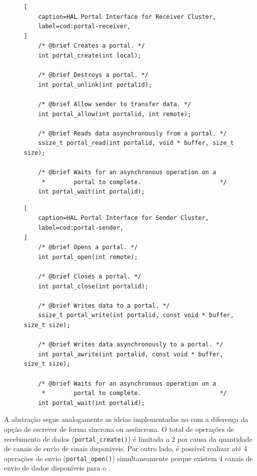\begin{figure}[t]
\begin{lstlisting}[
    caption=HAL Portal Interface for Receiver Cluster,
    label=cod:portal-receiver,
]
	/* @brief Creates a portal. */
    int portal_create(int local);

	/* @brief Destroys a portal. */
    int portal_unlink(int portalid);

    /* @brief Allow sender to transfer data. */
    int portal_allow(int portalid, int remote);

    /* @brief Reads data asynchronously from a portal. */
    ssize_t portal_read(int portalid, void * buffer, size_t size);

    /* @brief Waits for an asynchronous operation on a
     *        portal to complete.                      */
    int portal_wait(int portalid);
\end{lstlisting}
\end{figure}

\begin{figure}[t]
\begin{lstlisting}[
    caption=HAL Portal Interface for Sender Cluster,
    label=cod:portal-sender,
]
    /* @brief Opens a portal. */
    int portal_open(int remote);

	/* @brief Closes a portal. */
    int portal_close(int portalid);

	/* @brief Writes data to a portal. */
    ssize_t portal_write(int portalid, const void * buffer, size_t size);

    /* @brief Writes data asynchronously to a portal. */
    int portal_awrite(int portalid, const void * buffer, size_t size);
    
    /* @brief Waits for an asynchronous operation on a
     *        portal to complete.                      */
    int portal_wait(int portalid);
\end{lstlisting}
\end{figure}

        A abstração \portal segue analogamente as ideias implementadas
        no \mailbox com a diferença da opção de escrever de forma
        síncrona ou assíncrona.
        O total de operações de recebimento de dados (\texttt{portal\_create()})
        é limitada a 2 por causa da quantidade de canais de envio de sinais disponiveis.
        Por outro lado, é possível realizar até 4 operações de envio (\texttt{portal\_open()})
        simultaneamente porque existem 4 canais de envio de dados disponíveis para o \portal.

